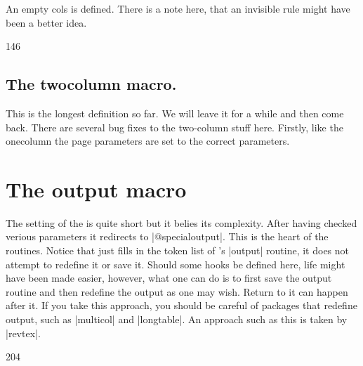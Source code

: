 An empty cols is defined. There is a note here, that an invisible rule might have been a better idea.

\begin{teXXX}
146 \def \@emptycol {\vbox{}\penalty -\@M}
\end{teXXX}

\subsection{The \string twocolumn macro.} This is the longest definition so far. We will leave it for a while and then come back. There are several bug fixes to the two-column stuff here. Firstly, like the onecolumn the page parameters are set to the correct parameters.


\begin{teXXX}
147 \def \twocolumn {%
148 \clearpage
149 \global\columnwidth\textwidth
150 \global\advance\columnwidth-\columnsep
151 \global\divide\columnwidth\tw@
152 \global\hsize\columnwidth
153 \global\linewidth\columnwidth
154 \global\@twocolumntrue
155 \global\@firstcolumntrue
156 \col@number \tw@
\end{teXXX}



\section*{The output macro}

The setting of the  is quite short but it belies its complexity.
After having checked verious parameters it redirects to |@specialoutput|. This is the heart of the routines. Notice that \latex just fills in the token list of \tex's |output| routine, it does not attempt to redefine it or save it. 
Should some hooks be defined here, life might have been made easier, however, what one can do is to first save the \latex output routine and then redefine the output as one may wish. Return to it can happen after it. If you take this approach, you should be careful of packages that redefine output, such as |multicol| and |longtable|. An approach such as this is taken by |revtex|.

\begin{teX}
204 
\end{teX}



